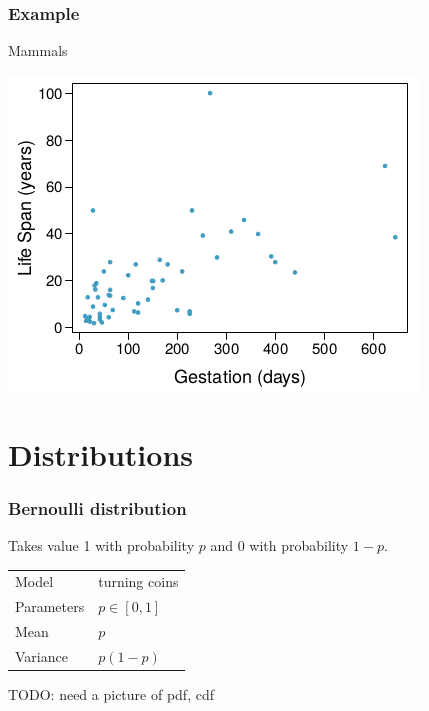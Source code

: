 \documentclass[t]{beamer}
\begin{document}
\begin{frame}
  \frametitle{Example}

  \centerline{Mammals}

  \centerline{\includegraphics[width=.8\textwidth]{mammal-gestation.png}}

  
\end{frame}

\section{Distributions}

\begin{frame}
  \frametitle{Bernoulli distribution}

  Takes value 1 with probability $p$ and 0 with probability $1-p$.
  \bigskip
  
  \begin{tabular}{ll}
    Model & turning coins\\[1mm]
    Parameters & $p\in [0,1]$\\[1mm]
    Mean & $p$\\[1mm]
    Variance & $p(1-p)$
  \end{tabular}

  TODO: need a picture of pdf, cdf
  
  \note{

  }
  
\end{frame}
\end{document}
